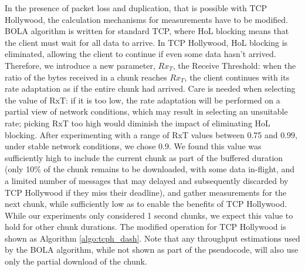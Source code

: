 In the presence of packet loss and duplication, that is possible with TCP Hollywood, the calculation 
mechanisms for measurements have to be modified. BOLA algorithm is written for standard TCP, where HoL blocking means that the client must wait for all data to arrive. In TCP Hollywood, HoL blocking is eliminated, allowing the client to continue if even some data hasn't arrived. Therefore, we introduce a new parameter, $Rx_{T}$, the Receive Threshold: when the ratio of the bytes received in a chunk reaches $Rx_{T}$, the client continues with its rate adaptation as if the entire chunk had arrived. Care is needed when selecting the value of RxT: if it is too low, the rate adaptation will be performed on a partial view of network conditions, which may result in selecting an unsuitable rate; picking RxT too high would diminish the impact of eliminating HoL blocking. After experimenting with a range of RxT values between 0.75 and 0.99, under stable network conditions, we chose 0.9. We found this value was sufficiently high to include the current chunk as part of the buffered duration (only 10\% of the chunk remains to be downloaded, with some data in-flight, and a limited number of messages that may delayed and subsequently discarded by TCP Hollywood if they miss their deadline), and gather measurements for the next chunk, while sufficiently low as to enable the benefits of TCP Hollywood. While our experiments only considered 1 second chunks, we expect this value to hold for other chunk durations. The modified operation for TCP Hollywood is shown as Algorithm \ref{algo:tcph_dash}. Note that any throughput estimations used by the BOLA algorithm, while not shown as part of the pseudocode, will also use only the partial download of the chunk. 





